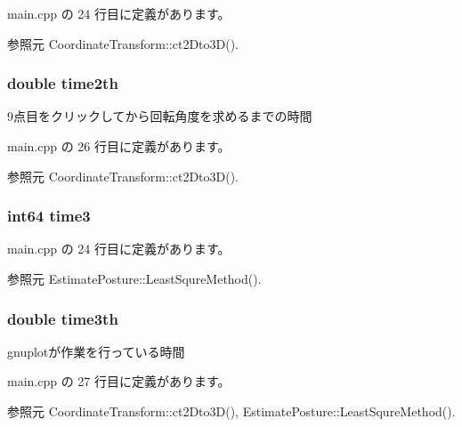  main.\-cpp の 24 行目に定義があります。



参照元 Coordinate\-Transform\-::ct2\-Dto3\-D().

\subsubsection[{time2th}]{\setlength{\rightskip}{0pt plus 5cm}double time2th}\label{main_8cpp_a682544663e12eb18837015a32fa84c81}


9点目をクリックしてから回転角度を求めるまでの時間 



 main.\-cpp の 26 行目に定義があります。



参照元 Coordinate\-Transform\-::ct2\-Dto3\-D().

\subsubsection[{time3}]{\setlength{\rightskip}{0pt plus 5cm}int64 time3}\label{main_8cpp_a0dd5ee6f0df25198c4c8bd4d78c9f3a3}


 main.\-cpp の 24 行目に定義があります。



参照元 Estimate\-Posture\-::\-Least\-Squre\-Method().

\subsubsection[{time3th}]{\setlength{\rightskip}{0pt plus 5cm}double time3th}\label{main_8cpp_a1040aab8fcdc8e241d94175099912c50}


gnuplotが作業を行っている時間 



 main.\-cpp の 27 行目に定義があります。



参照元 Coordinate\-Transform\-::ct2\-Dto3\-D(), Estimate\-Posture\-::\-Least\-Squre\-Method().

